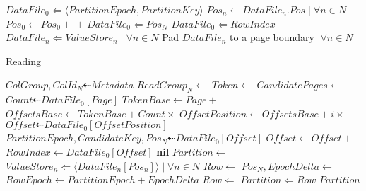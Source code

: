 \documentclass[fleqn]{article}
\begin{document}
\begin{algorithm}
\begin{algorithmic}[1]
   \EndFor
    \State $DataFile_{0} \Leftarrow \langle PartitionEpoch, PartitionKey \rangle$
    \State $Pos_{n} \gets DataFile_{n}.Pos \mid \forall n \in N$
    \State $Pos_{0} \gets Pos_0 + $  $ + $ 
    \State $DataFile_{0} \Leftarrow Pos_{N}$
    \State $DataFile_{0} \Leftarrow RowIndex$
    \State $DataFile_{n} \Leftarrow ValueStore_{n} \mid \forall n \in N$
    \State Pad $DataFile_{n}$ to a page boundary $\mid \forall n \in N$
   \EndFor
\EndProcedure
\end{algorithmic}
\end{algorithm}

\begin{algorithm}
\scriptsize
\caption{Reading}
\begin{algorithmic}[2]
\State $ColGroup, ColId_N \dashleftarrow Metadata$
\State $ReadGroup_N \gets $ 
\State $Token \gets $ 
\State $CandidatePages \gets $
 \State $Count \dashleftarrow DataFile_{0}[Page]$
 \State $TokenBase \gets Page +  $ 
 \State $OffsetsBase \gets TokenBase + Count \times $
 \For{$i \gets $ \Call{Find}{$DataFile_0[TokenBase \dots OffsetBase), Token$}}
  \State $OffsetPosition \gets OffsetsBase + i \times $ 
  \State $Offset \dashleftarrow DataFile_{0}[OffsetPosition]$
  \State $PartitionEpoch, CandidateKey, Pos_N \dashleftarrow DataFile_{0}[Offset]$
   \State $Offset \gets Offset + $ 
   \State $RowIndex \gets DataFile_0[Offset]$
   \State \Return {}
  \EndIf
 \EndFor
\EndFor
\Return \textbf{nil}
\EndFunction
\Statex
{}
\State $Partition \gets $ 
\State $ValueStore_n \Leftarrow \langle DataFile_n[Pos_n] \rangle \mid \forall n \in N$
 \State $Row \gets $ 
 \State $Pos_N, EpochDelta \gets$ 
 \State $RowEpoch \gets PartitionEpoch + EpochDelta$
  \State $Row \Leftarrow $ 
 \EndFor
 \State $Partition \Leftarrow Row$
\EndFor
\Return $Partition$
\EndFunction
\end{algorithmic}
\end{algorithm}
\end{document}
